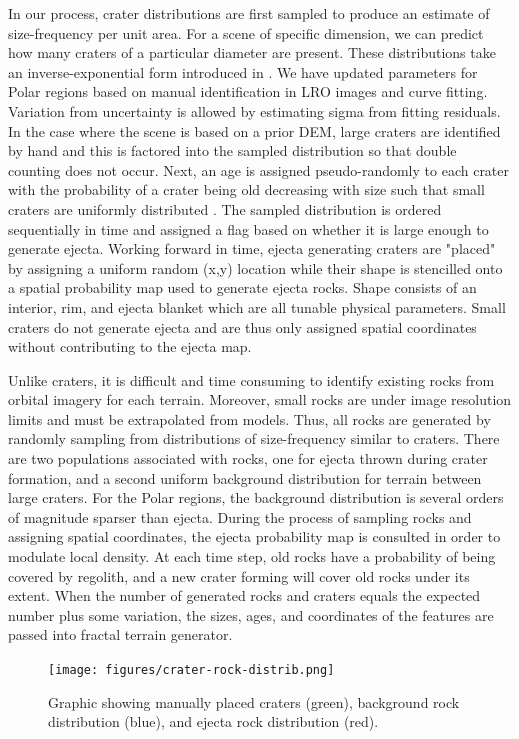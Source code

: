 \documentclass[twocolumn,letterpaper]{IEEEAerospaceCLS}  %
\begin{document}
In our process, crater distributions are first sampled to produce an estimate of size-frequency per unit area. 
For a scene of specific dimension, we can predict how many craters of a particular diameter are present. 
These distributions take an inverse-exponential form introduced in \cite{Surveyor1968}. 
We have updated parameters for Polar regions based on manual identification in LRO images and curve fitting. 
Variation from uncertainty is allowed by estimating sigma from fitting residuals. 
In the case where the scene is based on a prior DEM, large craters are identified by hand and this is factored into the sampled distribution so that double counting does not occur. 
Next, an age is assigned pseudo-randomly to each crater with the probability of a crater being old decreasing with size such that small craters are uniformly distributed \cite{Fassett2014}. 
The sampled distribution is ordered sequentially in time and assigned a flag based on whether it is large enough to generate ejecta. 
Working forward in time, ejecta generating craters are "placed" by assigning a uniform random (x,y) location while their shape is stencilled onto a spatial probability map used to generate ejecta rocks. 
Shape consists of an interior, rim, and ejecta blanket which are all tunable physical parameters. 
Small craters do not generate ejecta and are thus only assigned spatial coordinates without contributing to the ejecta map.

Unlike craters, it is difficult and time consuming to identify existing rocks from orbital imagery for each terrain. 
Moreover, small rocks are under image resolution limits and must be extrapolated from models. 
Thus, all rocks are generated by randomly sampling from distributions of size-frequency similar to craters. 
There are two populations associated with rocks, one for ejecta thrown during crater formation, and a second uniform background distribution for terrain between large craters. 
For the Polar regions, the background distribution is several orders of magnitude sparser than ejecta. 
During the process of sampling rocks and assigning spatial coordinates, the ejecta probability map is consulted in order to modulate local density. 
At each time step, old rocks have a probability of being covered by regolith, and a new crater forming will cover old rocks under its extent. 
When the number of generated rocks and craters equals the expected number plus some variation, the sizes, ages, and coordinates of the features are passed into fractal terrain generator.

\begin{figure}[h!]
  \texttt{[image: figures/crater-rock-distrib.png]}
  \caption{Graphic showing manually placed craters (green), background rock distribution (blue), and ejecta rock distribution (red).}
  \label{fig:crater-rock-distrib}
\end{figure}
\end{document}
